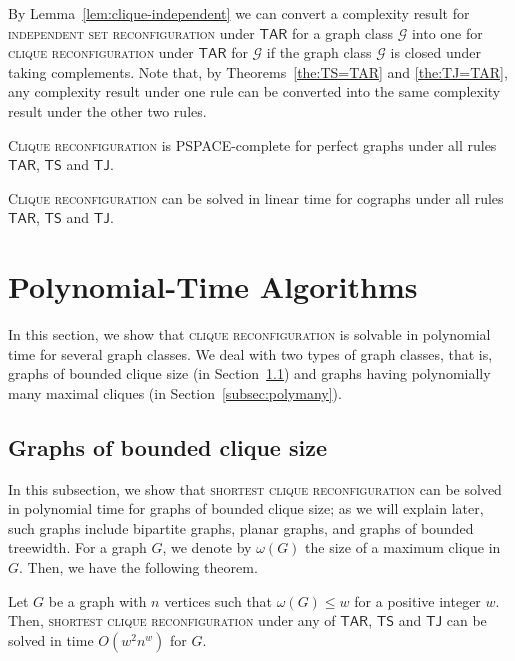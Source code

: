 \documentclass{llncs}
\newcommand{\TS}{\mathsf{TS}}
\newcommand{\TJ}{\mathsf{TJ}}
\newcommand{\TARrule}{\mathsf{TAR}}
\newcounter{one}
\newcounter{two}
\begin{document}
	By Lemma~\ref{lem:clique-independent} we can convert a complexity result for \textsc{independent set reconfiguration} under $\TARrule$ for a graph class $\mathcal{G}$ into one for \textsc{clique reconfiguration} under $\TARrule$ for $\mathcal{G}$ if the graph class $\mathcal{G}$ is closed under taking complements. 
	Note that, by Theorems~\ref{the:TS=TAR} and \ref{the:TJ=TAR}, any complexity result under one rule can be converted into the same complexity result under the other two rules. 

	\begin{proposition} \label{pro:perfect}
	\textsc{Clique reconfiguration} is PSPACE-complete for perfect graphs under all rules $\TARrule$, $\TS$ and $\TJ$.
	\end{proposition}

\begin{proposition} \label{pro:cograph}
	\textsc{Clique reconfiguration} can be solved in linear time for cographs under all rules $\TARrule$, $\TS$ and $\TJ$.
	\end{proposition}






	\section{Polynomial-Time Algorithms} \label{sec:polytime}
	In this section, we show that \textsc{clique reconfiguration} is solvable in polynomial time for several graph classes. 
	We deal with two types of graph classes, that is, graphs of bounded clique size (in Section~\ref{subsec:boundedclique}) and graphs having polynomially many maximal cliques (in Section~\ref{subsec:polymany}).

	\subsection{Graphs of bounded clique size}
	\label{subsec:boundedclique}
	
	In this subsection, we show that \textsc{shortest clique reconfiguration} can be solved in polynomial time for graphs of bounded clique size; 
as we will explain later, such graphs include bipartite graphs, planar graphs, and graphs of bounded treewidth.
	For a graph $G$, we denote by $\omega(G)$ the size of a maximum clique in $G$.
	Then, we have the following theorem. 
	\begin{theorem} \label{the:boundedclique}
	Let $G$ be a graph with $n$ vertices such that $\omega(G) \le w$ for a positive integer $w$. 
	Then, \textsc{shortest clique reconfiguration} under any of $\TARrule$, $\TS$ and $\TJ$ can be solved in time $O(w^2 n^{w})$ for $G$. 
\end{theorem}
	
\end{document}
